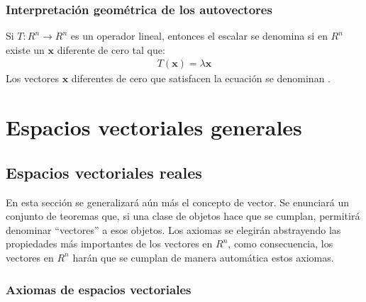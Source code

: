 \documentclass[a4paper,12pt]{article}
\begin{document}
\subsubsection{Interpretación geométrica de los autovectores}

\begin{theorem}
  Si $T:R^n\rightarrow R^n$ es un operador lineal, entonces el escalar se
  denomina  si en $R^n$ existe un $\mathbf{x}$ diferente
  de cero tal que:
  \begin{align*}
    T(\mathbf{x})=\lambda\mathbf{x}
  \end{align*}
  Los vectores $\mathbf{x}$ diferentes de cero que satisfacen la ecuación se
  denominan .
  \label{theo:transf_autovec}
\end{theorem}

\section{Espacios vectoriales generales}

\subsection{Espacios vectoriales reales}
En esta sección se generalizará aún más el concepto de vector. Se enunciará un
conjunto de teoremas que, si una clase de objetos hace que se cumplan,
permitirá denominar ``vectores'' a esos objetos. Los axiomas se elegirán
abstrayendo las propiedades más importantes de los vectores en $R^n$, como
consecuencia, los vectores en $R^n$ harán que se cumplan de manera automática
estos axiomas.

\subsubsection{Axiomas de espacios vectoriales}
\end{document}
